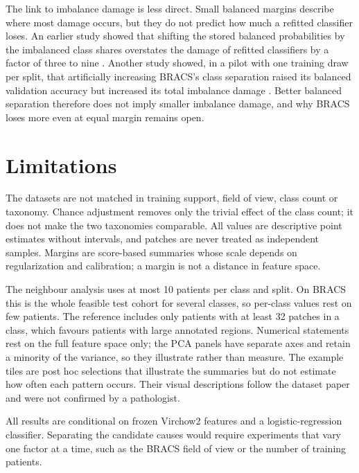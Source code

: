 \documentclass[11pt]{article}
\begin{document}
The link to imbalance damage is less direct. Small balanced margins describe where most damage occurs, but they do not predict how much a refitted classifier loses. An earlier study showed that shifting the stored balanced probabilities by the imbalanced class shares overstates the damage of refitted classifiers by a factor of three to nine \citep{queisler2026marginTcgaBracs}. Another study showed, in a pilot with one training draw per split, that artificially increasing BRACS's class separation raised its balanced validation accuracy but increased its total imbalance damage \citep{queisler2026separationTcgaBracs}. Better balanced separation therefore does not imply smaller imbalance damage, and why BRACS loses more even at equal margin remains open.

\section{Limitations}
\label{sec:limits}
The datasets are not matched in training support, field of view, class count or taxonomy. Chance adjustment removes only the trivial effect of the class count; it does not make the two taxonomies comparable. All values are descriptive point estimates without intervals, and patches are never treated as independent samples. Margins are score-based summaries whose scale depends on regularization and calibration; a margin is not a distance in feature space.

The neighbour analysis uses at most 10 patients per class and split. On BRACS this is the whole feasible test cohort for several classes, so per-class values rest on few patients. The reference includes only patients with at least 32 patches in a class, which favours patients with large annotated regions. Numerical statements rest on the full feature space only; the PCA panels have separate axes and retain a minority of the variance, so they illustrate rather than measure. The example tiles are post hoc selections that illustrate the summaries but do not estimate how often each pattern occurs. Their visual descriptions follow the dataset paper and were not confirmed by a pathologist.

All results are conditional on frozen Virchow2 features and a logistic-regression classifier. Separating the candidate causes would require experiments that vary one factor at a time, such as the BRACS field of view or the number of training patients.



\end{document}
